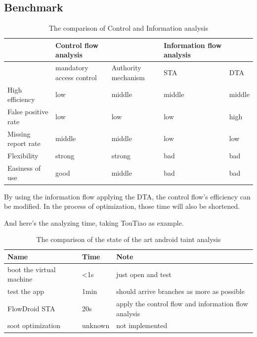 \documentclass{article}
\begin{document}
\subsection{Benchmark}


\begin{table}
  \caption{The comparison of Control and Information analysis}
   \centering
   \begin{tabular}{lllll}
     \toprule
        & Control flow analysis &    & Information flow analysis& \\
     \midrule
      & mandatory access control  & Authority mechanism & STA & DTA\\
     High efficiency& low & middle  &  middle &  middle \\
     False positive rate& low &  low  & low  & high \\
     Missing report rate&  middle & middle   & low &low \\
     Flexibility& strong & strong &bad &bad \\
     Easiness of use& good &   middle&bad &bad \\
     \bottomrule
   \end{tabular}
   \label{tab:table1}
 \end{table}

 By using the information flow applying the DTA, the control flow's efficiency can be modified. In the process of optimization, those time will also be shortened.

 And here's the analyzing time, taking TouTiao as example.
 
 \begin{table}
  \caption{The comparison of the state of the art android taint analysis}
   \centering
   \begin{tabular}{lll}
     \toprule
       Name & Time & Note \\
     \midrule
      boot the virtual machine& <1s &just open and test\\
      test the app& 1min &should arrive branches as more as possible\\
      FlowDroid STA&20s &apply the control flow and information flow analysis\\
      soot optimization&unknown &not implemented\\
     \bottomrule
   \end{tabular}
   \label{tab:table1}
 \end{table}
\end{document}
